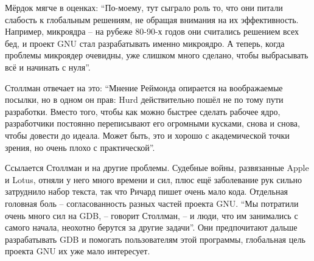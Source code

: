 Мёрдок мягче в оценках: ``По-моему, тут сыграло роль то, что они питали слабость к глобальным решениям, не обращая внимания на их эффективность. Например, микроядра -- на рубеже 80-90-х годов они считались решением всех бед, и проект GNU стал разрабатывать именно микроядро. А теперь, когда проблемы микроядер очевидны, уже слишком много сделано, чтобы выбрасывать всё и начинать с нуля''.

Столлман отвечает на это: ``Мнение Реймонда опирается на воображаемые посылки, но в одном он прав: Hurd действительно пошёл не по тому пути разработки. Вместо того, чтобы как можно быстрее сделать рабочее ядро, разработчики постоянно переписывают его огромными кусками, снова и снова, чтобы довести до идеала. Может быть, это и хорошо с академической точки зрения, но очень плохо с практической''.

Ссылается Столлман и на другие проблемы. Судебные войны, развязанные Apple и Lotus, отняли у него много времени и сил, плюс ещё заболевание рук сильно затруднило набор текста, так что Ричард пишет очень мало кода. Отдельная головная боль -- согласованность разных частей проекта GNU. ``Мы потратили очень много сил на GDB, -- говорит Столлман, -- и люди, что им занимались с самого начала, неохотно берутся за другие задачи''. Они предпочитают дальше разрабатывать GDB и помогать пользователям этой программы, глобальная цель проекта GNU их уже мало интересует.

